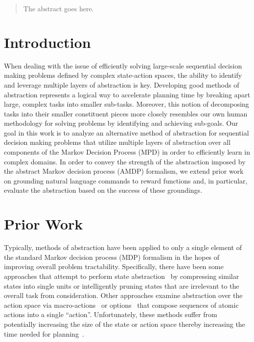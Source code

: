 \documentclass[conference]{IEEEtran}
\begin{document}
\maketitle

\begin{abstract}
The abstract goes here.
\end{abstract}

\IEEEpeerreviewmaketitle

\section{Introduction}
When dealing with the issue of efficiently solving large-scale sequential decision making problems defined by complex state-action spaces, the ability to identify and leverage multiple layers of abstraction is key. Developing good methods of abstraction represents a logical way to accelerate planning time by breaking apart large, complex tasks into smaller sub-tasks. Moreover, this notion of decomposing tasks into their smaller constituent pieces more closely resembles our own human methodology for solving problems by identifying and achieving sub-goals. Our goal in this work is to analyze an alternative method of abstraction for sequential decision making problems that utilize multiple layers of abstraction over all components of the Markov Decision Process (MPD) in order to efficiently learn in complex domains. In order to convey the strength of the abstraction imposed by the abstract Markov decision process (AMDP) formalism, we extend prior work on grounding natural language commands to reward functions and, in particular, evaluate the abstraction based on the success of these groundings.

\section{Prior Work}
Typically, methods of abstraction have been applied to only a single element of the standard Markov decision process (MDP) formalism in the hopes of improving overall problem tractability. Specifically, there have been some approaches that attempt to perform state abstraction~\cite{Li2006TowardsAU} by compressing similar states into single units or intelligently pruning states that are irrelevant to the overall task from consideration. Other approaches examine abstraction over the action space via macro-actions~\cite{Hauskrecht1998HierarchicalSO} or options~\cite{Sutton1999BetweenMA} that compose sequences of atomic actions into a single ``action''. Unfortunately, these methods suffer from potentially increasing the size of the state or action space thereby increasing the time needed for planning~\cite{Jong2008TheUO}.
\end{document}
